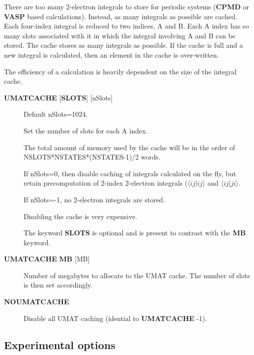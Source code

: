 \documentclass[openany,a4paper,10pt]{manual}
\newcommand{\bra}{\ensuremath{\langle}}
\newcommand{\ket}{\ensuremath{\rangle}}
\begin{document}
There are too many 2-electron integrals to store for periodic systems
(\textbf{CPMD} or \textbf{VASP} based calculations).  Instead, as many integrals as
possible are cached.  Each four-index integral is reduced to two indices,
A and B.  Each A index has so many slots associated with it in which
the integral involving A and B can be stored.  The cache stores
as many integrals as possible.  If the cache is full and a new integral
is calculated, then an element in the cache is over-written.

The efficiency of a calculation is heavily dependent on the size of the
integral cache.
\begin{description}
\item[\textbf{UMATCACHE} {[}\textbf{SLOTS}{]} {[}nSlots{]}]
Default nSlots=1024.

Set the number of slots for each A index.

The total amount of memory used by the cache will be in the order of
NSLOTS*NSTATES*(NSTATES-1)/2  words.

If nSlots=0, then disable caching of integrals calculated on the fly,
but retain precomputation of 2-index 2-electron integrals ($\bra
ij | ij \ket$ and $\bra ij | ji \ket$.

If nSlots=-1, no 2-electron integrals are stored.

Disabling the cache is very expensive.

The keyword \textbf{SLOTS} is optional and is present to contrast with
the \textbf{MB} keyword.

\item[\textbf{UMATCACHE} \textbf{MB} {[}MB{]}]
Number of megabytes to allocate to the UMAT cache.  The number of
slots is then set accordingly.

\item[\textbf{NOUMATCACHE}]
Disable all UMAT caching (idential to \textbf{UMATCACHE} -1).

\end{description}


\subsection{Experimental options}
\end{document}
